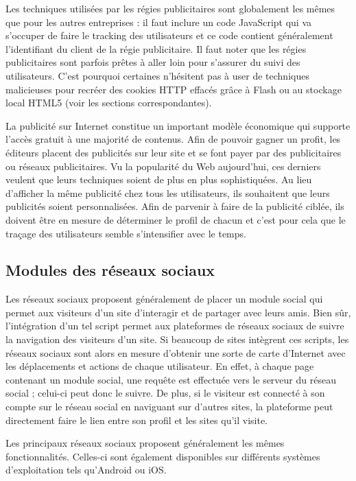 Les techniques utilisées par les régies publicitaires sont globalement les mêmes que pour les autres entreprises : il faut inclure un code JavaScript qui va s'occuper de faire le tracking des utilisateurs et ce code contient généralement l'identifiant du client de la régie publicitaire. Il faut noter que les régies publicitaires sont parfois prêtes à aller loin pour s'assurer du suivi des utilisateurs. C'est pourquoi certaines n'hésitent pas à user de techniques malicieuses pour recréer des cookies HTTP effacés grâce à Flash ou au stockage local HTML5 (voir les sections correspondantes).
\newline

La publicité sur Internet constitue un important modèle économique qui supporte l'accès gratuit à une majorité de contenus. Afin de pouvoir gagner un profit, les éditeurs placent des publicités sur leur site et se font payer par des publicitaires ou réseaux publicitaires. Vu la popularité du Web aujourd'hui, ces derniers veulent que leurs techniques soient de plus en plus sophistiquées. Au lieu d'afficher la même publicité chez tous les utilisateurs, ils souhaitent que leurs publicités soient personnalisées. Afin de parvenir à faire de la publicité ciblée, ils doivent être en mesure de déterminer le profil de chacun et c'est pour cela que le traçage des utilisateurs semble s'intensifier avec le temps.

\subsection{Modules des réseaux sociaux}
Les réseaux sociaux proposent généralement de placer un module social qui permet aux visiteurs d'un site d'interagir et de partager avec leurs amis. Bien sûr, l'intégration d'un tel script permet aux plateformes de réseaux sociaux de suivre la navigation des visiteurs d'un site. Si beaucoup de sites intègrent ces scripts, les réseaux sociaux sont alors en mesure d'obtenir une sorte de carte d'Internet avec les déplacements et actions de chaque utilisateur. En effet, à chaque page contenant un module social, une requête est effectuée vers le serveur du réseau social ; celui-ci peut donc le suivre. De plus, si le visiteur est connecté à son compte sur le réseau social en naviguant sur d'autres sites, la plateforme peut directement faire le lien entre son profil et les sites qu'il visite.
\newline

Les principaux réseaux sociaux proposent généralement les mêmes fonctionnalités. Celles-ci sont également disponibles sur différents systèmes d'exploitation tels qu'Android ou iOS.

